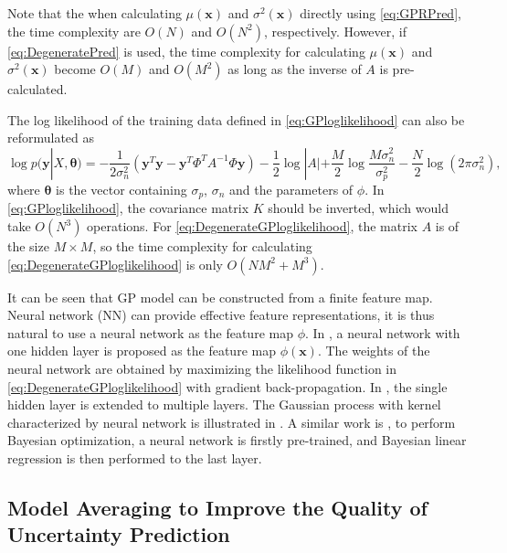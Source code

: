 Note that the when calculating $\mu(\bm{x})$ and $\sigma^2(\bm{x})$ directly using \eqref{eq:GPRPred}, the time complexity are $O(N)$ and $O(N^2)$, respectively. However, if \eqref{eq:DegeneratePred} is used, the time complexity for calculating $\mu(\bm{x})$ and $\sigma^2(\bm{x})$ become $O(M)$ and $O(M^2)$ as long as the inverse of $A$ is pre-calculated.

The log likelihood of the training data defined in \eqref{eq:GPloglikelihood} can also be reformulated as \cite{lazaro2010marginalized}
\begin{equation}
    \label{eq:DegenerateGPloglikelihood}
    \log p(\bm{y} | X, \bm{\theta}) = -\frac{1}{2\sigma_n^2}(\bm{y}^T\bm{y} - \bm{y}^T \Phi^T A^{-1} \Phi \bm{y}) - \frac{1}{2}\log |A| + \frac{M}{2} \log \frac{M \sigma_n^2}{\sigma_p^2} - \frac{N}{2} \log(2 \pi \sigma_n^2),
\end{equation}
where $\bm{\theta}$ is the vector containing $\sigma_p$, $\sigma_n$ and the parameters of $\phi$. In \eqref{eq:GPloglikelihood}, the covariance matrix $K$ should be inverted, which would take $O(N^3)$ operations. For \eqref{eq:DegenerateGPloglikelihood}, the matrix $A$ is of the size $M \times M$, so the time complexity for calculating \eqref{eq:DegenerateGPloglikelihood} is only $O(NM^2 + M^3)$.

It can be seen that GP model can be constructed from a finite feature map. Neural network (NN) can provide effective feature representations, it is thus natural to use a neural network as the feature map $\phi$. In \cite{lazaro2010marginalized}, a neural network with one hidden layer is proposed as the feature map $\phi(\bm{x})$. The weights of the neural network are obtained by maximizing the likelihood function in \eqref{eq:DegenerateGPloglikelihood} with gradient back-propagation. In \cite{huang2015scalable}, the single hidden layer is extended to multiple layers. The Gaussian process with kernel characterized by neural network is illustrated in . A similar work is \cite{snoek2015scalable}, to perform Bayesian optimization, a neural network is firstly pre-trained, and Bayesian linear regression is then performed to the last layer.

\subsection{Model Averaging to Improve the Quality of Uncertainty Prediction}\label{sec:deepensemble}

